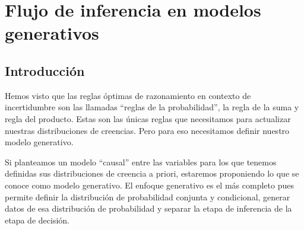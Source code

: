 \section{Flujo de inferencia en modelos generativos} \label{sec:flujo}

\subsection{Introducci\'on}

Hemos visto que las reglas \'optimas de razonamiento en contexto de incertidumbre son las llamadas ``reglas de la probabilidad'', la regla de la suma y regla del producto.
Estas son las \'unicas reglas que necesitamos para actualizar nuestras distribuciones de creencias.
Pero para eso necesitamos definir nuestro modelo generativo.

Si planteamos un modelo ``causal'' entre las variables para los que tenemos definidas sus distribuciones de creencia a priori, estaremos proponiendo lo que se conoce como modelo generativo.
El enfoque generativo es el m\'as completo pues permite definir la distribuci\'on de probabilidad conjunta y condicional, generar datos de esa distribuci\'on de probabilidad y separar la etapa de inferencia de la etapa de decisi\'on.



